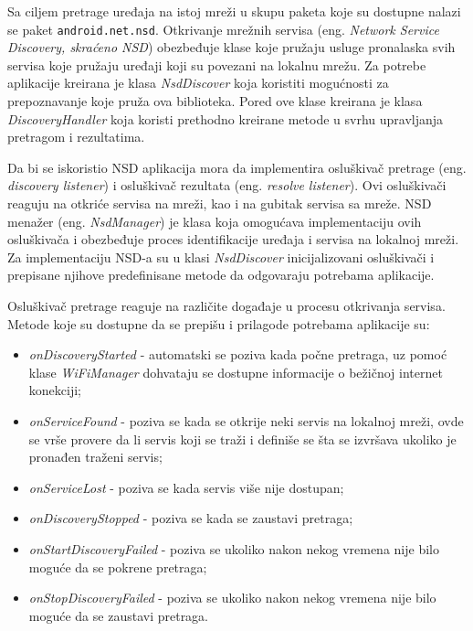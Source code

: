 \documentclass[struktura.tex]{subfiles}
\begin{document}
Sa ciljem pretrage uređaja na istoj mreži u skupu paketa koje su dostupne nalazi se paket  \verb|android.net.nsd|. Otkrivanje mrežnih servisa (eng. \textit{Network Service Discovery, skraćeno NSD}) \cite{sajt:nsd} obezbeđuje klase koje pružaju usluge pronalaska svih servisa koje pružaju uređaji koji su povezani na lokalnu mrežu. Za potrebe aplikacije kreirana je klasa \textit{NsdDiscover} koja koristiti mogućnosti za prepoznavanje koje pruža ova biblioteka. Pored ove klase kreirana je klasa \textit{DiscoveryHandler} koja koristi prethodno kreirane metode u svrhu upravljanja pretragom i rezultatima.

Da bi se iskoristio NSD aplikacija mora da implementira osluškivač pretrage (eng. \textit{discovery listener}) i osluškivač rezultata (eng. \textit{resolve listener}). Ovi osluškivači reaguju na otkriće servisa na mreži, kao i na gubitak servisa sa mreže. NSD menažer (eng. \textit{NsdManager}) je klasa koja omogućava implementaciju ovih osluškivača i obezbeđuje proces identifikacije uređaja i servisa na lokalnoj mreži. Za implementaciju NSD-a su u klasi \textit{NsdDiscover} inicijalizovani osluškivači i prepisane njihove predefinisane metode da odgovaraju potrebama aplikacije.

Osluškivač pretrage reaguje na različite događaje u procesu otkrivanja servisa. Metode koje su dostupne da se prepišu i prilagode potrebama aplikacije su:
\begin{itemize}
    \item \textit{onDiscoveryStarted} - automatski se poziva kada počne pretraga, uz pomoć klase \textit{WiFiManager} dohvataju se dostupne informacije o bežičnoj internet konekciji;
    \item \textit{onServiceFound} - poziva se kada se otkrije neki servis na lokalnoj mreži, ovde se vrše provere da li servis koji se traži i definiše se šta se izvršava ukoliko je pronađen traženi servis;
    \item \textit{onServiceLost} - poziva se kada servis više nije dostupan;
    \item \textit{onDiscoveryStopped} - poziva se kada se zaustavi pretraga; 
    \item \textit{onStartDiscoveryFailed} - poziva se ukoliko nakon nekog vremena nije bilo moguće da se pokrene pretraga;
    \item \textit{onStopDiscoveryFailed} - poziva se ukoliko nakon nekog vremena nije bilo moguće da se zaustavi pretraga.
\end{itemize}
\end{document}
